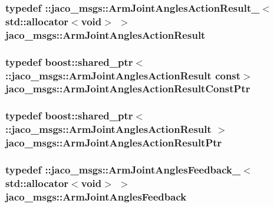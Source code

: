 \subsubsection[{\texorpdfstring{Arm\+Joint\+Angles\+Action\+Result}{ArmJointAnglesActionResult}}]{\setlength{\rightskip}{0pt plus 5cm}typedef \+::{\bf jaco\+\_\+msgs\+::\+Arm\+Joint\+Angles\+Action\+Result\+\_\+}$<$std\+::allocator$<$void$>$ $>$ {\bf jaco\+\_\+msgs\+::\+Arm\+Joint\+Angles\+Action\+Result}}\hypertarget{namespacejaco__msgs_a575d1947e16ac78511c74fc00dc8006a}{}\label{namespacejaco__msgs_a575d1947e16ac78511c74fc00dc8006a}
\subsubsection[{\texorpdfstring{Arm\+Joint\+Angles\+Action\+Result\+Const\+Ptr}{ArmJointAnglesActionResultConstPtr}}]{\setlength{\rightskip}{0pt plus 5cm}typedef boost\+::shared\+\_\+ptr$<$ \+::{\bf jaco\+\_\+msgs\+::\+Arm\+Joint\+Angles\+Action\+Result} const$>$ {\bf jaco\+\_\+msgs\+::\+Arm\+Joint\+Angles\+Action\+Result\+Const\+Ptr}}\hypertarget{namespacejaco__msgs_a9fed6803f229ee175ae5078fdc8327fe}{}\label{namespacejaco__msgs_a9fed6803f229ee175ae5078fdc8327fe}
\subsubsection[{\texorpdfstring{Arm\+Joint\+Angles\+Action\+Result\+Ptr}{ArmJointAnglesActionResultPtr}}]{\setlength{\rightskip}{0pt plus 5cm}typedef boost\+::shared\+\_\+ptr$<$ \+::{\bf jaco\+\_\+msgs\+::\+Arm\+Joint\+Angles\+Action\+Result} $>$ {\bf jaco\+\_\+msgs\+::\+Arm\+Joint\+Angles\+Action\+Result\+Ptr}}\hypertarget{namespacejaco__msgs_aa05f56804913edb95541044daf226bd2}{}\label{namespacejaco__msgs_aa05f56804913edb95541044daf226bd2}
\subsubsection[{\texorpdfstring{Arm\+Joint\+Angles\+Feedback}{ArmJointAnglesFeedback}}]{\setlength{\rightskip}{0pt plus 5cm}typedef \+::{\bf jaco\+\_\+msgs\+::\+Arm\+Joint\+Angles\+Feedback\+\_\+}$<$std\+::allocator$<$void$>$ $>$ {\bf jaco\+\_\+msgs\+::\+Arm\+Joint\+Angles\+Feedback}}\hypertarget{namespacejaco__msgs_a4a089d2dddd537667698d8700c9fe4b8}{}\label{namespacejaco__msgs_a4a089d2dddd537667698d8700c9fe4b8}
